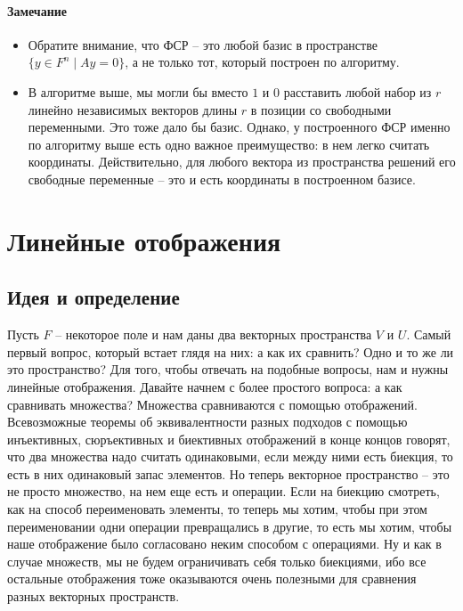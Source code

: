 \paragraph{Замечание}

\begin{itemize}
\item Обратите внимание, что ФСР -- это любой базис в пространстве $\{y\in F^n \mid Ay = 0\}$, а не только тот, который построен по алгоритму.

\item В алгоритме выше, мы могли бы вместо $1$ и $0$ расставить любой набор из $r$ линейно независимых векторов длины $r$ в позиции со свободными переменными.
Это тоже дало бы базис.
Однако, у построенного ФСР именно по алгоритму выше есть одно важное преимущество: в нем легко считать координаты.
Действительно, для любого вектора из пространства решений его свободные переменные -- это и есть координаты в построенном базисе.
\end{itemize}

\newpage
\section{Линейные отображения}

\subsection{Идея и определение}

Пусть $F$ -- некоторое поле и нам даны два векторных пространства $V$ и $U$.
Самый первый вопрос, который встает глядя на них: а как их сравнить?
Одно и то же ли это пространство?
Для того, чтобы отвечать на подобные вопросы, нам и нужны линейные отображения.
Давайте начнем с более простого вопроса: а как сравнивать множества?
Множества сравниваются с помощью отображений.
Всевозможные теоремы об эквивалентности разных подходов с помощью инъективных, сюръективных и биективных отображений в конце концов говорят, что два множества надо считать одинаковыми, если между ними есть биекция, то есть в них одинаковый запас элементов.
Но теперь векторное пространство -- это не просто множество, на нем еще есть и операции.
Если на биекцию смотреть, как на способ переименовать элементы, то теперь мы хотим, чтобы при этом переименовании одни операции превращались в другие, то есть мы хотим, чтобы наше отображение было согласовано неким способом с операциями.
Ну и как в случае множеств, мы не будем ограничивать себя только биекциями, ибо все остальные отображения тоже оказываются очень полезными для сравнения разных векторных пространств.

